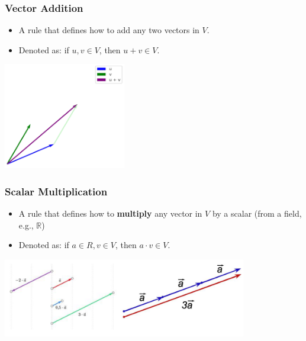 \documentclass[10pt]{article}
\begin{document}
\subsubsection*{Vector Addition}
\begin{itemize}
	\item A rule that defines how to add any two vectors in $V$.
	\item Denoted as: if $u, v \in V$, then $u + v \in V$.
\end{itemize}
\begin{center} 
	\includegraphics*[width=0.4\textwidth]{M8_2.png} 
\end{center}

\subsubsection*{Scalar Multiplication}
\begin{itemize}
	\item A rule that defines how to \textbf{multiply} any vector in $V$ by a scalar (from a field, e.g., $\mathbb{R}$)
	\item Denoted as: if $a \in R, v \in V$, then $a \cdot v \in V$.
\end{itemize}
\begin{center} 
	\includegraphics*[width=0.8\textwidth]{M8_3.png} 
\end{center}
\end{document}
